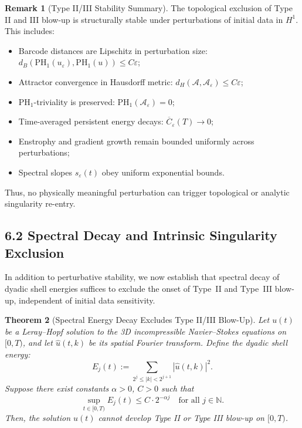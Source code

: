 \documentclass[11pt]{article}
\newtheorem{theorem}{Theorem}[section]
\theoremstyle{definition}
\newtheorem{remark}[theorem]{Remark}
\begin{document}
\begin{remark}[Type II/III Stability Summary]
The topological exclusion of Type II and III blow-up is structurally stable under perturbations of initial data in $H^1$. This includes:
\begin{itemize}
    \item Barcode distances are Lipschitz in perturbation size: $d_B(\mathrm{PH}_1(u_\varepsilon), \mathrm{PH}_1(u)) \le C \varepsilon$;
    \item Attractor convergence in Hausdorff metric: $d_H(\mathcal{A}, \mathcal{A}_\varepsilon) \le C \varepsilon$;
    \item PH$_1$-triviality is preserved: $\mathrm{PH}_1(\mathcal{A}_\varepsilon) = 0$;
    \item Time-averaged persistent energy decays: $\overline{C}_\varepsilon(T) \to 0$;
    \item Enstrophy and gradient growth remain bounded uniformly across perturbations;
    \item Spectral slopes $s_\varepsilon(t)$ obey uniform exponential bounds.
\end{itemize}
Thus, no physically meaningful perturbation can trigger topological or analytic singularity re-entry.
\end{remark}

\subsection{6.2 Spectral Decay and Intrinsic Singularity Exclusion}

In addition to perturbative stability, we now establish that spectral decay of dyadic shell energies suffices to exclude the onset of Type~II and Type~III blow-up, independent of initial data sensitivity.

\begin{theorem}[Spectral Energy Decay Excludes Type II/III Blow-Up]
Let \( u(t) \) be a Leray--Hopf solution to the 3D incompressible Navier--Stokes equations on \( [0,T) \), and let \( \hat{u}(t,k) \) be its spatial Fourier transform. Define the dyadic shell energy:
\[
E_j(t) := \sum_{2^j \le |k| < 2^{j+1}} |\hat{u}(t,k)|^2.
\]
Suppose there exist constants \( \alpha > 0 \), \( C > 0 \) such that
\[
\sup_{t \in [0,T)} E_j(t) \le C \cdot 2^{-\alpha j} \quad \text{for all } j \in \mathbb{N}.
\]
Then, the solution \( u(t) \) cannot develop Type II or Type III blow-up on \( [0,T) \).
\end{theorem}
\end{document}
